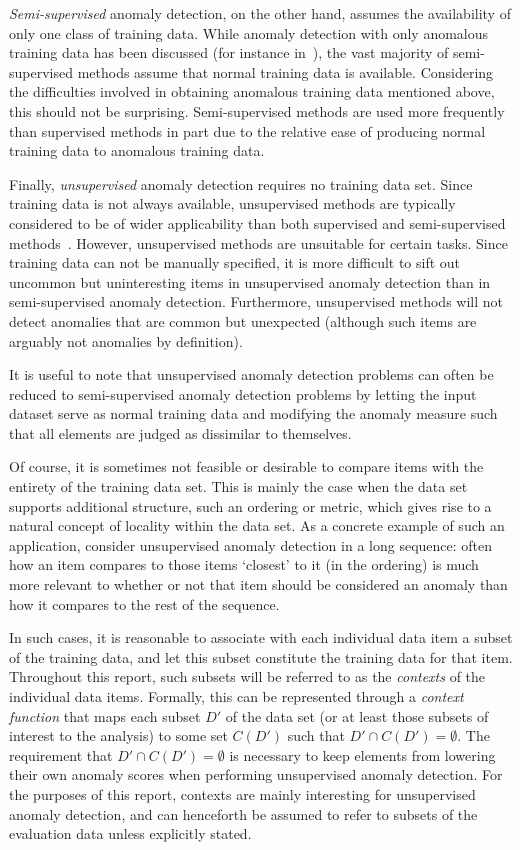 \emph{Semi-supervised} anomaly detection, on the other hand, assumes the availability of only one class of training data. While anomaly detection with only anomalous training data has been discussed (for instance in~\cite{dasgupta}), the vast majority of semi-supervised methods assume that normal training data is available. Considering the difficulties involved in obtaining anomalous training data mentioned above, this should not be surprising. Semi-supervised methods are used more frequently than supervised methods in part due to the relative ease of producing normal training data to anomalous training data.

Finally, \emph{unsupervised} anomaly detection requires no training data set. Since training data is not always available, unsupervised methods are typically considered to be of wider applicability than both supervised and semi-supervised methods~\cite{chandola}. However, unsupervised methods are unsuitable for certain tasks. Since training data can not be manually specified, it is more difficult to sift out uncommon but uninteresting items in unsupervised anomaly detection than in semi-supervised anomaly detection. Furthermore, unsupervised methods will not detect anomalies that are common but unexpected (although such items are arguably not anomalies by definition).

It is useful to note that unsupervised anomaly detection problems can often be reduced to semi-supervised anomaly detection problems by letting the input dataset serve as normal training data and modifying the anomaly measure such that all elements are judged as dissimilar to themselves.

Of course, it is sometimes not feasible or desirable to compare items with the entirety of the training data set. This is mainly the case when the data set supports additional structure, such an ordering or metric, which gives rise to a natural concept of locality within the data set. As a concrete example of such an application, consider unsupervised anomaly detection in a long sequence: often how an item compares to those items `closest' to it (in the ordering) is much more relevant to whether or not that item should be considered an anomaly than how it compares to the rest of the sequence.

In such cases, it is reasonable to associate with each individual data item a subset of the training data, and let this subset constitute the training data for that item. Throughout this report, such subsets will be referred to as the \emph{contexts} of the individual data items. Formally, this can be represented through a \emph{context function} that maps each subset $D'$ of the data set (or at least those subsets of interest to the analysis) to some set $C(D')$ such that $D' \cap C(D') = \emptyset$. The requirement that $D' \cap C(D') = \emptyset$ is necessary to keep elements from lowering their own anomaly scores when performing unsupervised anomaly detection. For the purposes of this report, contexts are mainly interesting for unsupervised anomaly detection, and can henceforth be assumed to refer to subsets of the evaluation data unless explicitly stated.


